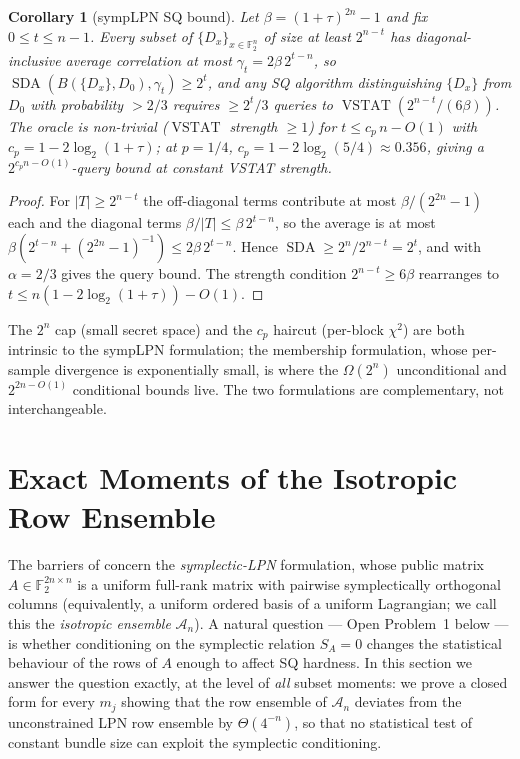 \documentclass[11pt,a4paper]{article}
\theoremstyle{plain}
\newtheorem{corollary}[theorem]{Corollary}
\theoremstyle{definition}
\newcommand{\F}{\mathbb{F}}
\DeclareMathOperator{\SDA}{SDA}
\DeclareMathOperator{\VSTAT}{VSTAT}
\begin{document}
\begin{corollary}[sympLPN SQ bound]
\label{cor:symplpn-sq}
Let $\beta = (1+\tau)^{2n}-1$ and fix $0 \leq t \leq n-1$. Every subset of $\{D_x\}_{x \in \F_2^n}$ of size at least $2^{n-t}$ has diagonal-inclusive average correlation at most $\gamma_t = 2\beta\, 2^{t-n}$, so $\SDA(B(\{D_x\}, D_0), \gamma_t) \geq 2^t$, and any SQ algorithm distinguishing $\{D_x\}$ from $D_0$ with probability $> 2/3$ requires $\geq 2^t/3$ queries to $\VSTAT(2^{n-t}/(6\beta))$. The oracle is non-trivial ($\VSTAT$ strength $\geq 1$) for $t \leq c_p\, n - O(1)$ with $c_p = 1 - 2\log_2(1+\tau)$; at $p = 1/4$, $c_p = 1 - 2\log_2(5/4) \approx 0.356$, giving a $2^{c_p n - O(1)}$-query bound at constant VSTAT strength.
\end{corollary}

\begin{proof}
For $|T| \geq 2^{n-t}$ the off-diagonal terms contribute at most $\beta/(2^{2n}-1)$ each and the diagonal terms $\beta/|T| \leq \beta\, 2^{t-n}$, so the average is at most $\beta(2^{t-n} + (2^{2n}-1)^{-1}) \leq 2\beta\, 2^{t-n}$. Hence $\SDA \geq 2^n/2^{n-t} = 2^t$, and  with $\alpha = 2/3$ gives the query bound. The strength condition $2^{n-t} \geq 6\beta$ rearranges to $t \leq n(1 - 2\log_2(1+\tau)) - O(1)$.
\end{proof}

The $2^n$ cap (small secret space) and the $c_p$ haircut (per-block $\chi^2$) are both intrinsic to the sympLPN formulation; the membership formulation, whose per-sample divergence is exponentially small, is where the $\Omega(2^n)$ unconditional and $2^{2n-O(1)}$ conditional bounds live. The two formulations are complementary, not interchangeable.


\section{Exact Moments of the Isotropic Row Ensemble}
\label{sec:moments}

The barriers of  concern the \emph{symplectic-LPN} formulation, whose public matrix $A \in \F_2^{2n \times n}$ is a uniform full-rank matrix with pairwise symplectically orthogonal columns (equivalently, a uniform ordered basis of a uniform Lagrangian; we call this the \emph{isotropic ensemble} $\mathcal{A}_n$). A natural question --- Open Problem~1 below --- is whether conditioning on the symplectic relation $S_A = 0$ changes the statistical behaviour of the rows of $A$ enough to affect SQ hardness. In this section we answer the question exactly, at the level of \emph{all} subset moments: we prove a closed form for every $m_j$ showing that the row ensemble of $\mathcal{A}_n$ deviates from the unconstrained LPN row ensemble by $\Theta(4^{-n})$, so that no statistical test of constant bundle size can exploit the symplectic conditioning.
\end{document}
